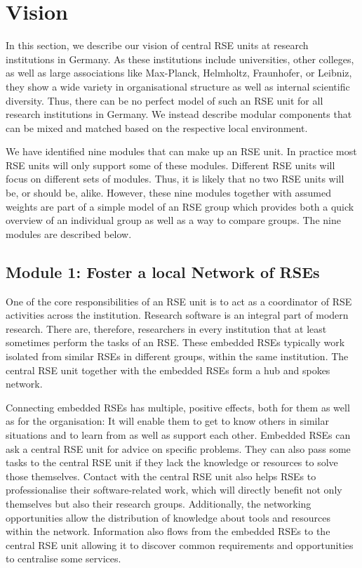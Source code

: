 \documentclass[a4paper]{article}
\begin{document}
\section{Vision}%
\label{sec:vision}
In this section, we describe our vision of central RSE units at research institutions in Germany.
As these institutions include universities, other colleges, as well as large associations like Max-Planck, Helmholtz, Fraunhofer, or Leibniz,
they show a wide variety in organisational structure as well as internal scientific diversity.
Thus, there can be no perfect model of such an RSE unit for all research institutions in Germany.
We instead describe modular components that can be mixed and matched based on the respective local environment.

We have identified nine modules that can make up an RSE unit.
In practice most RSE units will only support some of these modules.
Different RSE units will focus on different sets of modules.
Thus, it is likely that no two RSE units will be, or should be, alike.
However, these nine modules together with assumed weights are part of a simple model of an RSE group which provides both a quick overview of an individual group as well as a way to compare groups.
The nine modules are described below.

\subsection{Module 1: Foster a local Network of RSEs}%
\label{sec:network}

One of the core responsibilities of an RSE unit is to act as a coordinator of RSE activities across the institution.
Research software is an integral part of modern research. 
There are, therefore, researchers in every institution that at least sometimes perform the tasks of an RSE.
These embedded RSEs typically work isolated from similar RSEs in different groups, within the same institution.
The central RSE unit together with the embedded RSEs form a hub and spokes network.

Connecting embedded RSEs has multiple, positive effects, both for them as well as for the organisation:
It will enable them to get to know others in similar situations and to learn from as well as support each other.
Embedded RSEs can ask a central RSE unit for advice on specific problems.
They can also pass some tasks to the central RSE unit if they lack the knowledge or resources to solve those themselves.
Contact with the central RSE unit also helps RSEs to professionalise their software-related work, which will directly benefit not only themselves but also their research groups.
Additionally, the networking opportunities allow the distribution of knowledge about tools and resources within the network.
Information also flows from the embedded RSEs to the central RSE unit allowing it to discover common requirements and opportunities to centralise some services.
\end{document}
